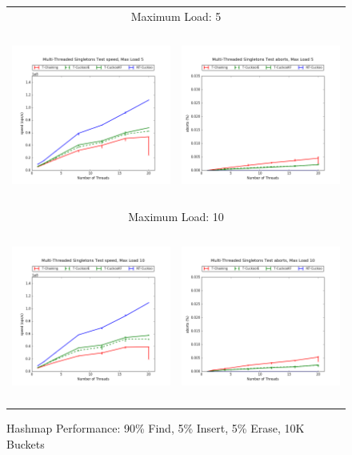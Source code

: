 \begin{figure}[h!]
    \centering
    \caption{Hashmap Performance: 90\% Find, 5\% Insert, 5\% Erase, 10K Buckets}
    \begin{tabular}{|cc|}
        \hline 
        \multicolumn{2}{|c|}{{\footnotesize Maximum Load: 5}}\\
        \includegraphics[height=2.25in]{maps/5HM10K:F90,I5,E5speed.png} &
        \includegraphics[height=2.25in]{maps/5HM10K:F90,I5,E5aborts.png}\\
        \hline 
        \multicolumn{2}{|c|}{{\footnotesize Maximum Load: 10}}\\
        \includegraphics[height=2.25in]{maps/10HM10K:F90,I5,E5speed.png} &
        \includegraphics[height=2.25in]{maps/10HM10K:F90,I5,E5aborts.png}\\

\end{tabular}
\end{figure}
